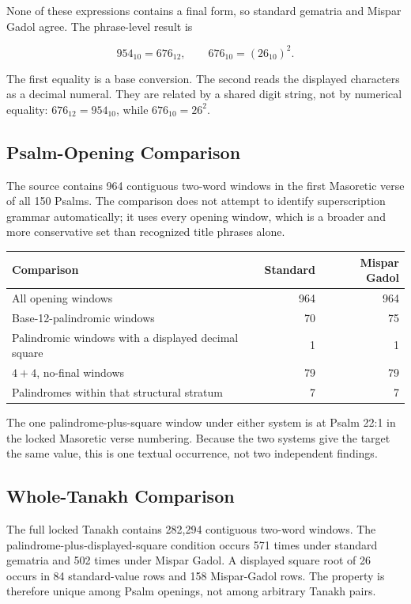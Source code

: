 None of these expressions contains a final form, so standard gematria and Mispar Gadol agree. The phrase-level result is

\[
954_{10}=676_{12},
\qquad
676_{10}=(26_{10})^2.
\]

The first equality is a base conversion. The second reads the displayed characters as a decimal numeral. They are related by a shared digit string, not by numerical equality: $676_{12}=954_{10}$, while $676_{10}=26^2$.

\subsection{Psalm-Opening Comparison}

The source contains 964 contiguous two-word windows in the first Masoretic verse of all 150 Psalms. The comparison does not attempt to identify superscription grammar automatically; it uses every opening window, which is a broader and more conservative set than recognized title phrases alone.

\begin{center}
\small
\begin{tabular}{lrr}
\toprule
Comparison & Standard & Mispar Gadol \\
\midrule
All opening windows & 964 & 964 \\
Base-12-palindromic windows & 70 & 75 \\
Palindromic windows with a displayed decimal square & 1 & 1 \\
$4+4$, no-final windows & 79 & 79 \\
Palindromes within that structural stratum & 7 & 7 \\
\bottomrule
\end{tabular}
\end{center}

The one palindrome-plus-square window under either system is  at Psalm 22:1 in the locked Masoretic verse numbering. Because the two systems give the target the same value, this is one textual occurrence, not two independent findings.

\subsection{Whole-Tanakh Comparison}

The full locked Tanakh contains 282,294 contiguous two-word windows. The palindrome-plus-displayed-square condition occurs 571 times under standard gematria and 502 times under Mispar Gadol. A displayed square root of 26 occurs in 84 standard-value rows and 158 Mispar-Gadol rows. The property is therefore unique among Psalm openings, not among arbitrary Tanakh pairs.

